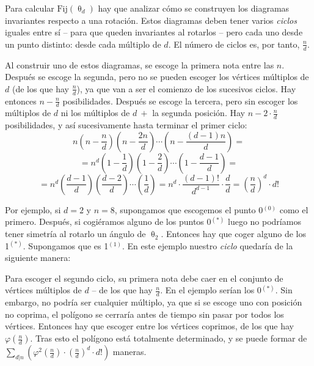 		Para calcular $\mbox{Fij}(\uptheta_d)$ hay que analizar cómo se construyen los diagramas invariantes respecto a una rotación. Estos diagramas deben tener varios \textit{ciclos} iguales entre sí -- para que queden invariantes al rotarlos -- pero cada uno desde un punto distinto: desde cada múltiplo de $d$. El número de ciclos es, por tanto, $\frac{n}{d}$.
		
		Al construir uno de estos diagramas, se escoge la primera nota entre las $n$. Después se escoge la segunda, pero no se pueden escoger los vértices múltiplos de $d$ (de los que hay $\frac{n}{d}$), ya que van a ser el comienzo de los sucesivos ciclos. Hay entonces $n-\frac{n}{d}$ posibilidades. Después se escoge la tercera, pero sin escoger los múltiplos de $d$ ni los múltiplos de $d\ +$ la segunda posición. Hay $n - 2\cdot\frac{n}{d}$ posibilidades, y así sucesivamente hasta terminar el primer ciclo:
		\[n\left(n-\frac{n}{d}\right)\left(n-\frac{2n}{d}\right)\cdots\left(n-\frac{(d-1)n}{d}\right)=\] 
		\[=n^d\left(1-\frac{1}{d}\right)\left(1-\frac{2}{d}\right)\cdots\left(1-\frac{d-1}{d}\right)=\]
		\[=n^d\left(\frac{d-1}{d}\right)\left(\frac{d-2}{d}\right)\cdots\left(\frac{1}{d}\right)=n^d\cdot\frac{(d-1)!}{d^{d-1}}\cdot\frac{d}{d}=\left(\frac{n}{d}\right)^d\cdot d!\]
		
		Por ejemplo, si $d=2$ y $n=8$, supongamos que escogemos el punto 0$^{(0)}$ como el primero. Después, si cogiéramos alguno de los puntos 0$^{(*)}$ luego no podríamos tener simetría al rotarlo un ángulo de $\uptheta_2$. Entonces hay que coger alguno de los 1$^{(*)}$. Supongamos que es 1$^{(1)}$. En este ejemplo nuestro \textit{ciclo} quedaría de la siguiente manera:
		
		
		Para escoger el segundo ciclo, su primera nota debe caer en el conjunto de vértices múltiplos de $d$ -- de los que hay $\frac{n}{d}$. En el ejemplo serían los 0$^{(*)}$. Sin embargo, no podría ser cualquier múltiplo, ya que si se escoge uno con posición no coprima, el polígono se cerraría antes de tiempo sin pasar por todos los vértices. Entonces hay que escoger entre los vértices coprimos, de los que hay $\varphi\left(\frac{n}{d}\right)$. Tras esto el polígono está totalmente determinado, y se puede formar de $\sum\limits_{d|n}\left(\varphi^2(\frac{n}{d})\cdot\left(\frac{n}{d}\right)^d\cdot d!\right)$ maneras.
		
